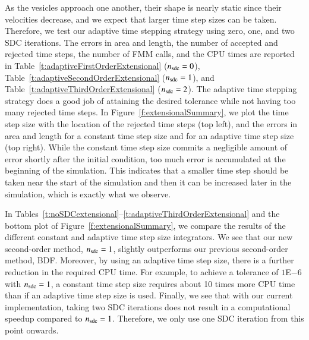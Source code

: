As the vesicles approach one another, their shape is nearly static
since their velocities decrease, and we expect that larger time step
sizes can be taken.  Therefore, we test our adaptive time stepping
strategy using zero, one, and two SDC iterations.  The errors in area
and length, the number of accepted and rejected time steps, the number
of FMM calls, and the CPU times are reported in
Table~\ref{t:adaptiveFirstOrderExtensional} ($n_{{\mathrm{sdc}}}=0$),
Table~\ref{t:adaptiveSecondOrderExtensional} ($n_{{\mathrm{sdc}}}=1$), and
Table~\ref{t:adaptiveThirdOrderExtensional} ($n_{{\mathrm{sdc}}}=2$).  The
adaptive time stepping strategy does a good job of attaining the
desired tolerance while not having too many rejected time steps.  In
Figure~\ref{f:extensionalSummary}, we plot the time step size with the
location of the rejected time steps (top left), and the errors in area
and length for a constant time step size and for an adaptive time step
size (top right).  While the constant time step size commits a
negligible amount of error shortly after the initial condition, too
much error is accumulated at the beginning of the simulation.  This
indicates that a smaller time step should be taken near the start of
the simulation and then it can be increased later in the simulation,
which is exactly what we observe.

In
Tables~\ref{t:noSDCextensional}--\ref{t:adaptiveThirdOrderExtensional}
and the bottom plot of Figure~\ref{f:extensionalSummary}, we compare
the results of the different constant and adaptive time step size
integrators.  We see that our new second-order method, $n_{{\mathrm{sdc}}} = 1$,
slightly outperforms our previous second-order method, BDF.  Moreover,
by using an adaptive time step size, there is a further reduction in
the required CPU time.  For example, to achieve a tolerance of $1$E$-6$
with $n_{{\mathrm{sdc}}}=1$, a constant time step size requires about 10 times
more CPU time than if an adaptive time step size is used.  Finally, we
see that with our current implementation, taking two SDC iterations
does not result in a computational speedup compared to $n_{{\mathrm{sdc}}}=1$.
Therefore, we only use one SDC iteration from this point onwards.


